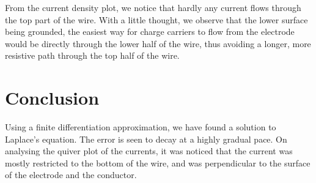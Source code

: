\documentclass[10pt,a4paper]{article}
\begin{document}
From the current density plot, we notice that hardly any current flows through the top part of the wire. With a little thought, we observe that the lower surface being grounded, the easiest way for charge carriers to flow from the electrode would be directly through the lower half of the wire, thus avoiding a longer,  more resistive path through the top half of the wire.

 \section{Conclusion}

Using a finite differentiation approximation, we have found a solution to Laplace's equation. The error is seen to decay at a highly gradual pace. On analysing the quiver plot of the currents, it was noticed that the current was mostly restricted to the bottom of the wire, and was perpendicular to the surface of the electrode and the conductor. 
\end{document}
